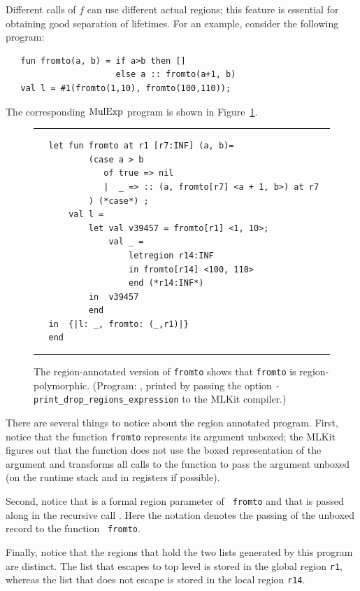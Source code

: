 \documentclass[12pt]{book}
\begin{document}
Different calls of $f$ can use different actual regions; this feature
is essential for obtaining good separation of lifetimes.  For an
example, consider the following program:
\begin{verbatim}
   fun fromto(a, b) = if a>b then []
                      else a :: fromto(a+1, b)
   val l = #1(fromto(1,10), fromto(100,110));
\end{verbatim}
The corresponding $\hbox{\rm MulExp}$ program is shown in
Figure~\ref{fromto.fig}.
\begin{figure}[htb]
\hrule
\medskip
\begin{verbatim}
   let fun fromto at r1 [r7:INF] (a, b)= 
           (case a > b 
              of true => nil
              |  _ => :: (a, fromto[r7] <a + 1, b>) at r7
           ) (*case*) ; 
       val l = 
           let val v39457 = fromto[r1] <1, 10>; 
               val _ = 
                   letregion r14:INF 
                   in fromto[r14] <100, 110> 
                   end (*r14:INF*)
           in  v39457
           end 
   in  {|l: _, fromto: (_,r1)|}
   end 
\end{verbatim}
\caption{The region-annotated version of {\tt fromto} shows that {\tt fromto}
  is region-polymorphic. (Program: , printed
  by passing the option {\tt -print\_drop\_regions\_expression} to the
  MLKit compiler.)}  \medskip

\hrule
\label{fromto.fig}
\end{figure}

There are several things to notice about the region annotated program.
First, notice that the function {\tt fromto} represents its argument
%
%
%
unboxed; the MLKit figures out that the function does not
use the boxed representation of the argument and transforms all calls
to the function to pass the argument unboxed (on the runtime stack and
in registers if possible).

Second, notice that  is a formal region parameter of {\tt
  fromto} and that  is passed along in the recursive call
. Here the notation 
denotes the passing of the unboxed record to the function {\tt
  fromto}.

%
Finally, notice that the regions that hold the two lists generated by
this program are distinct.  The list that escapes to top level is
stored in the global region {\tt r1}, whereas the list that does not
escape is stored in the local region {\tt r14}.
\end{document}
